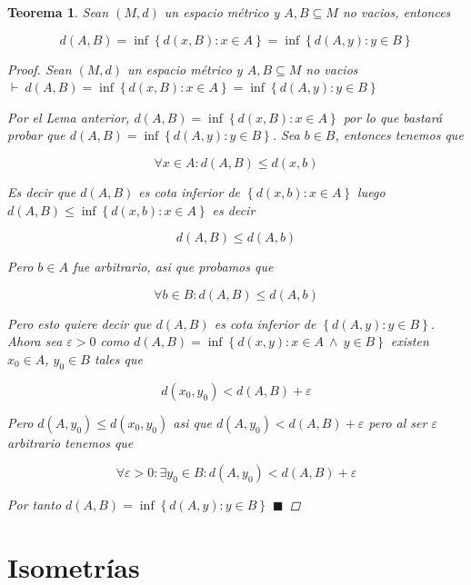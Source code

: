 \documentclass[oneside]{book} %
\theoremstyle{Teorema}
\newtheorem{Teorema}[Definicion]{Teorema}
\theoremstyle{Ejemplos}
\theoremstyle{[Obs]}
\renewcommand{\{}{\left\lbrace} %
\renewcommand{\}}{\right\rbrace} %
\newcommand{\y}{\ \wedge\ } %
\renewcommand{\sc}{\subseteq} %
\renewcommand{\qed}{$\blacksquare$} %
\newcommand{\pd}{$\vdash\ $} %
\begin{document}
			\begin{Teorema}\setlength{\parindent}{0em}
				
				Sean $(M, d)$ un espacio métrico y $A, B \sc M$ no vacios, entonces 

				\[ d(A, B) = \inf\{ d(x, B) : x \in A \} = \inf\{ d(A, y) : y \in B \} \] 

				\begin{proof}
					
					Sean $(M, d)$ un espacio métrico y $A, B \sc M$ no vacios \\
					\pd $d(A, B) = \inf\{ d(x, B) : x \in A \} = \inf\{ d(A, y) : y \in B \}$

					Por el Lema anterior, $d(A, B) = \inf\{ d(x, B) : x \in A \}$ por lo que bastará probar que $d(A, B) = \inf\{ d(A, y) : y \in B \}$. Sea $b \in B$, entonces tenemos que 
					
					\[ \forall x \in A: d(A, B) \leq d(x, b) \]

					Es decir que $d(A, B)$ es cota inferior de $\{ d(x, b) : x \in A \}$ luego $d(A, B) \leq \inf\{ d(x, b) : x \in A \}$ es decir

					\[ d(A, B) \leq d(A, b) \]

					Pero $b \in A$ fue arbitrario, asi que probamos que 

					\[ \forall b \in B : d(A, B) \leq d(A, b) \]

					Pero esto quiere decir que $d(A, B)$ es cota inferior de $\{ d(A, y) : y \in B \}$. Ahora sea $\varepsilon > 0$ como $d(A, B) = \inf\{ d(x, y) : x \in A \y y \in B \}$ existen $x_0 \in A$, $y_0 \in B$ tales que 

					\[ d(x_0, y_0) < d(A, B) + \varepsilon \]

					Pero $d(A, y_0) \leq d(x_0, y_0)$ asi que $d(A, y_0) < d(A, B) + \varepsilon$ pero al ser $\varepsilon$ arbitrario tenemos que 

					\[ \forall \varepsilon > 0 : \exists y_0 \in B : d(A, y_0) < d(A, B) + \varepsilon \]

					Por tanto $d(A, B) = \inf\{ d(A, y) : y \in B \}$ \qed

				\end{proof}

			\end{Teorema}

		\section{Isometrías}
\end{document}
